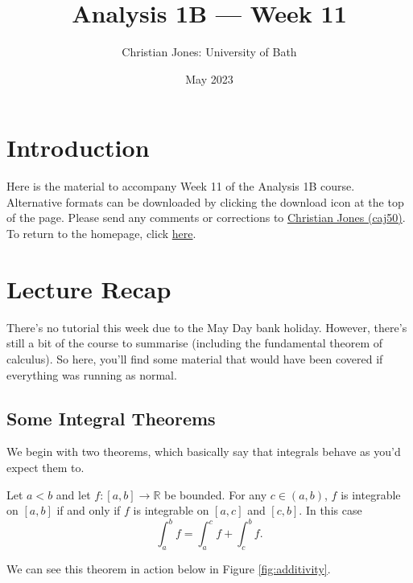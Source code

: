 \documentclass[
  17pt,
  a4paper]{extarticle}
\title{Analysis 1B --- Week 11}
\author{Christian Jones: University of Bath}
\date{May 2023}
\theoremstyle{plain}
\theoremstyle{definition}
\theoremstyle{plain}
\theoremstyle{plain}
\theoremstyle{plain}
\theoremstyle{plain}
\theoremstyle{definition}
\theoremstyle{definition}
\theoremstyle{remark}
\theoremstyle{remark}
\let\BeginKnitrBlock\begin \let\EndKnitrBlock\end
\renewcommand{\;}{\,}
\begin{document}
\maketitle

{
\setcounter{tocdepth}{2}
\tableofcontents
}
\newpage
{}

\hypertarget{introduction}{%
\section*{Introduction}\label{introduction}}

Here is the material to accompany Week 11 of the Analysis 1B course. Alternative formats can be downloaded by clicking the download icon at the top of the page. Please send any comments or corrections to \href{mailto:caj50@bath.ac.uk}{Christian Jones (caj50)}. To return to the homepage, click \href{http://caj50.github.io/tutoring.html}{here}.

\hypertarget{lecture-recap}{%
\section{Lecture Recap}\label{lecture-recap}}

There's no tutorial this week due to the May Day bank holiday. However, there's still a bit of the course to summarise (including the fundamental theorem of calculus). So here, you'll find some material that would have been covered if everything was running as normal.

\hypertarget{some-integral-theorems}{%
\subsection{Some Integral Theorems}\label{some-integral-theorems}}

We begin with two theorems, which basically say that integrals behave as you'd expect them to.

\BeginKnitrBlock{theorem}[Additivity of the Integral]
{\label{thm:thm1} }Let \(a<b\) and let \(f:[a,b] \to \mathbb{R}\) be bounded. For any \(c \in (a,b)\), \(f\) is integrable on \([a,b]\) if and only if \(f\) is integrable on \([a,c]\) and \([c,b].\) In this case \[\int_a^b f = \int_a^c f + \int_c^b f.\]
\EndKnitrBlock{theorem}

We can see this theorem in action below in Figure \ref{fig:additivity}.
\end{document}
